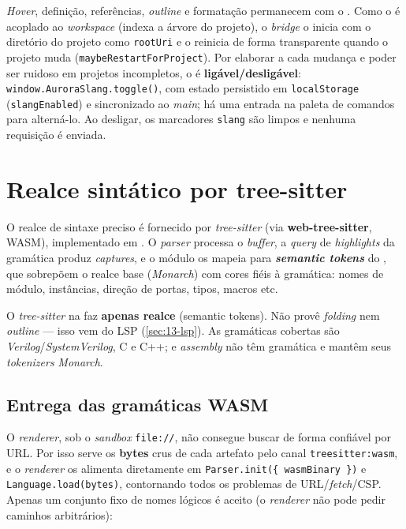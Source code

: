 \textit{Hover}, definição, referências, \textit{outline} e formatação
permanecem com o . Como o  é acoplado ao
\textit{workspace} (indexa a árvore do projeto), o \textit{bridge} o inicia com
o diretório do projeto como \lstinline|rootUri| e o reinicia de forma
transparente quando o projeto muda (\lstinline|maybeRestartForProject|). Por
elaborar a cada mudança e poder ser ruidoso em projetos incompletos, o
 é \textbf{ligável/desligável}: \lstinline|window.AuroraSlang.toggle()|,
com estado persistido em \lstinline|localStorage| (\lstinline|slangEnabled|) e
sincronizado ao \textit{main}; há uma entrada na paleta de comandos para
alterná-lo. Ao desligar, os marcadores \lstinline|slang| são limpos e nenhuma
requisição é enviada.

\section{Realce sintático por tree-sitter}
\label{sec:13-treesitter}

O realce de sintaxe preciso é fornecido por \textit{tree-sitter} (via
\textbf{web-tree-sitter}, WASM), implementado em
. O \textit{parser} processa o
\textit{buffer}, a \textit{query} de \textit{highlights} da gramática produz
\textit{captures}, e o módulo os mapeia para \textbf{\textit{semantic tokens}}
do , que sobrepõem o realce base (\textit{Monarch}) com cores
fiéis à gramática: nomes de módulo, instâncias, direção de portas, tipos,
macros etc.

\begin{nota}
O \textit{tree-sitter} na  faz \textbf{apenas realce} (semantic
tokens). Não provê \textit{folding} nem \textit{outline} — isso vem do LSP
(\autoref{sec:13-lsp}). As gramáticas cobertas são
\textit{Verilog}/\textit{SystemVerilog}, C e C++; \cmm{} e \textit{assembly}
não têm gramática e mantêm seus \textit{tokenizers} \textit{Monarch}.
\end{nota}

\subsection{Entrega das gramáticas WASM}

O \textit{renderer}, sob o \textit{sandbox} \lstinline|file://|, não consegue
buscar  de forma confiável por URL. Por isso 
serve os \textbf{bytes} crus de cada artefato pelo canal
\lstinline|treesitter:wasm|, e o \textit{renderer} os alimenta diretamente em
\lstinline|Parser.init({ wasmBinary })| e \lstinline|Language.load(bytes)|,
contornando todos os problemas de URL/\textit{fetch}/CSP. Apenas um conjunto fixo
de nomes lógicos é aceito (o \textit{renderer} não pode pedir caminhos
arbitrários):

